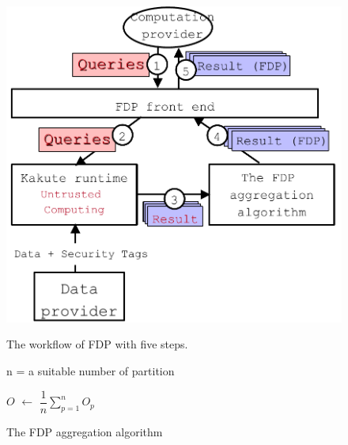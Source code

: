 \begin{figure}[!htb]
    \begin{minipage}{0.44\textwidth}
        \includegraphics[width=0.3\textheight]{figures/selective_arch.pdf}
        \vspace{-.1in}
        \caption{The workflow of FDP with five steps.}
        \label{fig:vm-tree}
    \end{minipage}
    \begin{minipage}{0.54\textwidth}
      \centering

      
      
      \begin{algorithm}[H] \label{algo:fdp}
\SetAlgoLined
{}
  n = a suitable number of partition


 $O$ $\leftarrow$ $\dfrac{1}{n}\sum\limits_{p=1}^n O_p$

 \caption{The FDP aggregation algorithm}
 \label{algo:combined}
\end{algorithm}
      

\end{minipage}
\end{figure}
